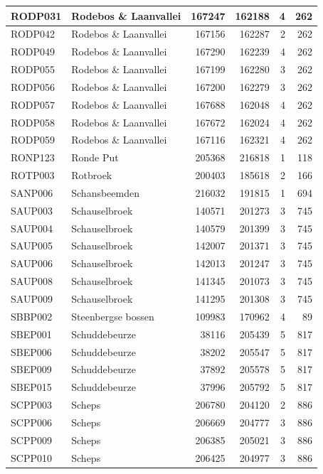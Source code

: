 \documentclass[11pt,]{book}
\begin{document}
\begin{table}
\begin{tabular}[t]{l|l|r|r|r|r}
\hline
RODP031 & Rodebos \& Laanvallei & 167247 & 162188 & 4 & 262\\
\hline
RODP042 & Rodebos \& Laanvallei & 167156 & 162287 & 2 & 262\\
\hline
RODP049 & Rodebos \& Laanvallei & 167290 & 162239 & 4 & 262\\
\hline
RODP055 & Rodebos \& Laanvallei & 167199 & 162280 & 3 & 262\\
\hline
RODP056 & Rodebos \& Laanvallei & 167200 & 162279 & 3 & 262\\
\hline
RODP057 & Rodebos \& Laanvallei & 167688 & 162048 & 4 & 262\\
\hline
RODP058 & Rodebos \& Laanvallei & 167672 & 162024 & 4 & 262\\
\hline
RODP059 & Rodebos \& Laanvallei & 167116 & 162321 & 4 & 262\\
\hline
RONP123 & Ronde Put & 205368 & 216818 & 1 & 118\\
\hline
ROTP003 & Rotbroek & 200403 & 185618 & 2 & 166\\
\hline
SANP006 & Schansbeemden & 216032 & 191815 & 1 & 694\\
\hline
SAUP003 & Schauselbroek & 140571 & 201273 & 3 & 745\\
\hline
SAUP004 & Schauselbroek & 140579 & 201399 & 3 & 745\\
\hline
SAUP005 & Schauselbroek & 142007 & 201371 & 3 & 745\\
\hline
SAUP006 & Schauselbroek & 142013 & 201247 & 3 & 745\\
\hline
SAUP008 & Schauselbroek & 141345 & 201073 & 3 & 745\\
\hline
SAUP009 & Schauselbroek & 141295 & 201308 & 3 & 745\\
\hline
SBBP002 & Steenbergse bossen & 109983 & 170962 & 4 & 89\\
\hline
SBEP001 & Schuddebeurze & 38116 & 205439 & 5 & 817\\
\hline
SBEP006 & Schuddebeurze & 38202 & 205547 & 5 & 817\\
\hline
SBEP009 & Schuddebeurze & 37892 & 205578 & 5 & 817\\
\hline
SBEP015 & Schuddebeurze & 37996 & 205792 & 5 & 817\\
\hline
SCPP003 & Scheps & 206780 & 204120 & 2 & 886\\
\hline
SCPP006 & Scheps & 206669 & 204777 & 3 & 886\\
\hline
SCPP009 & Scheps & 206385 & 205021 & 3 & 886\\
\hline
SCPP010 & Scheps & 206425 & 204977 & 3 & 886\\

\end{tabular}
\end{table}
\end{document}
